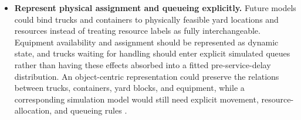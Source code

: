 \begin{itemize}
   \item \textbf{Represent physical assignment and queueing explicitly.}
    Future models could bind trucks and containers to physically feasible
    yard locations and resources instead of treating resource labels as fully
    interchangeable. Equipment availability and assignment should be represented
    as dynamic state, and trucks waiting for handling should enter explicit
    simulated queues rather than having these effects absorbed into a fitted
    pre-service-delay distribution. An object-centric representation could
    preserve the relations between trucks, containers, yard blocks, and
    equipment, while a corresponding simulation model would still need explicit
    movement, resource-allocation, and queueing rules
    \cite{VanDerAalst2023OCPM,Knopp2023ObjectCentricSimulation}.

    
    
\end{itemize}
